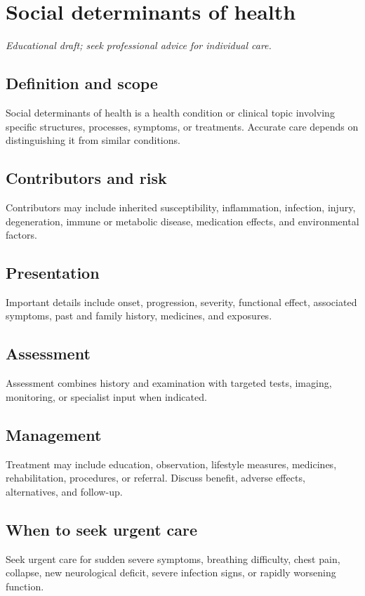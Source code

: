 \chapter{Social determinants of health}
\medskip
\noindent\textit{Educational draft; seek professional advice for individual care.}

\section*{Definition and scope}
Social determinants of health is a health condition or clinical topic involving specific structures, processes, symptoms, or treatments. Accurate care depends on distinguishing it from similar conditions.

\section*{Contributors and risk}
Contributors may include inherited susceptibility, inflammation, infection, injury, degeneration, immune or metabolic disease, medication effects, and environmental factors.

\section*{Presentation}
Important details include onset, progression, severity, functional effect, associated symptoms, past and family history, medicines, and exposures.

\section*{Assessment}
Assessment combines history and examination with targeted tests, imaging, monitoring, or specialist input when indicated.

\section*{Management}
Treatment may include education, observation, lifestyle measures, medicines, rehabilitation, procedures, or referral. Discuss benefit, adverse effects, alternatives, and follow-up.

\section*{When to seek urgent care}
Seek urgent care for sudden severe symptoms, breathing difficulty, chest pain, collapse, new neurological deficit, severe infection signs, or rapidly worsening function.

